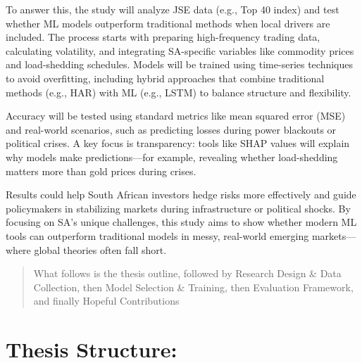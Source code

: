 \documentclass[11pt,preprint]{elsarticle}
\numberwithin{equation}{section}
\numberwithin{figure}{section}
\numberwithin{table}{section}
\begin{document}
To answer this, the study will analyze JSE data (e.g., Top 40 index) and
test whether ML models outperform traditional methods when local drivers
are included. The process starts with preparing high-frequency trading
data, calculating volatility, and integrating SA-specific variables like
commodity prices and load-shedding schedules. Models will be trained
using time-series techniques to avoid overfitting, including hybrid
approaches that combine traditional methods (e.g., HAR) with ML (e.g.,
LSTM) to balance structure and flexibility.

Accuracy will be tested using standard metrics like mean squared error
(MSE) and real-world scenarios, such as predicting losses during power
blackouts or political crises. A key focus is transparency: tools like
SHAP values will explain why models make predictions---for example,
revealing whether load-shedding matters more than gold prices during
crises.

Results could help South African investors hedge risks more effectively
and guide policymakers in stabilizing markets during infrastructure or
political shocks. By focusing on SA's unique challenges, this study aims
to show whether modern ML tools can outperform traditional models in
messy, real-world emerging markets---where global theories often fall
short.

\begin{quote}
What follows is the thesis outline, followed by Research Design \& Data
Collection, then Model Selection \& Training, then Evaluation Framework,
and finally Hopeful Contributions
\end{quote}

\section{Thesis Structure:}\label{thesis-structure}
\end{document}
